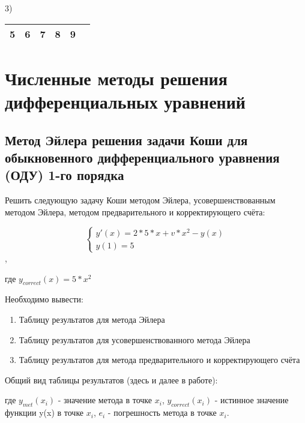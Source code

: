 \documentclass[bachelor, och, pract]{SCWorks}
\begin{document}
3)
\begin{table}[H]
    \centering
    \begin{tabular}{|c|c|c|c|c|c|}
\hline 5&6&7&8&9 \\\hline
    \end{tabular}
\end{table}


\section{Численные методы решения дифференциальных уравнений}

\subsection{Метод Эйлера решения задачи Коши для обыкновенного
дифференциального уравнения (ОДУ) 1-го порядка}

Решить следующую задачу Коши методом Эйлера, усовершенствованным методом Эйлера, методом предварительного и корректирующего счёта:

$$ 
\begin{cases}
y'(x) = 2 * 5 * x + v * x^2 - y(x) \\
y(1) = 5
\end{cases} $$,

где $y_{correct}(x) = 5 * x^2$

Необходимо вывести:
\begin{enumerate}
    \item Таблицу результатов для метода Эйлера
    \item Таблицу результатов для усовершенствованного метода Эйлера
    \item Таблицу результатов для метода предварительного и корректирующего счёта
\end{enumerate}

Общий вид таблицы результатов (здесь и далее в работе):


где $y_{met}(x_i)$ - значение метода в точке $x_i$, $y_{correct}(x_i)$ - истинное значение функции y(x) в точке $x_i$, $e_i$ - погрешность метода в точке $x_i$.
\end{document}
